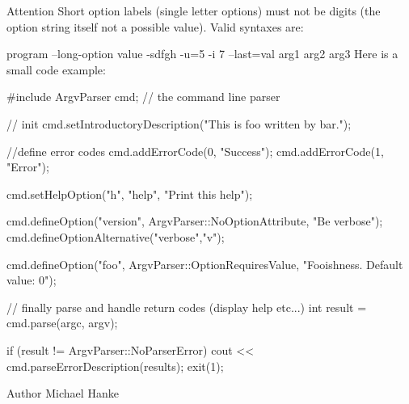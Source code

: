 \begin{DoxyAttention}{Attention}
Short option labels (single letter options) must not be digits (the option string itself not a possible value). Valid syntaxes are\-: \begin{DoxyItemize}
\item program --long-\/option value -\/sdfgh -\/u=5 -\/i 7 --last=val arg1 arg2 arg3 Here is a small code example\-: 
\begin{DoxyCode}
\textcolor{preprocessor}{#include}
\textcolor{preprocessor}{}ArgvParser cmd;  \textcolor{comment}{// the command line parser}

\textcolor{comment}{// init}
cmd.setIntroductoryDescription(\textcolor{stringliteral}{"This is foo written by bar."});

\textcolor{comment}{//define error codes}
cmd.addErrorCode(0, \textcolor{stringliteral}{"Success"});
cmd.addErrorCode(1, \textcolor{stringliteral}{"Error"});

cmd.setHelpOption(\textcolor{stringliteral}{"h"}, \textcolor{stringliteral}{"help"}, \textcolor{stringliteral}{"Print this help"});

cmd.defineOption(\textcolor{stringliteral}{"version"}, ArgvParser::NoOptionAttribute, \textcolor{stringliteral}{"Be verbose"});
cmd.defineOptionAlternative(\textcolor{stringliteral}{"verbose"},\textcolor{stringliteral}{"v"});

cmd.defineOption(\textcolor{stringliteral}{"foo"}, ArgvParser::OptionRequiresValue, \textcolor{stringliteral}{"Fooishness. Default value: 0"});

\textcolor{comment}{// finally parse and handle return codes (display help etc...)}
\textcolor{keywordtype}{int} result = cmd.parse(argc, argv);

\textcolor{keywordflow}{if} (result != ArgvParser::NoParserError)
  cout << cmd.parseErrorDescription(results);
  exit(1);
\end{DoxyCode}
\end{DoxyItemize}

\end{DoxyAttention}
\begin{DoxyAuthor}{Author}
Michael Hanke 
\end{DoxyAuthor}


